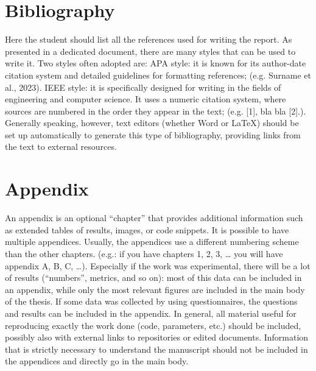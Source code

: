 \documentclass[a4paper, oneside]{book}
\begin{document}



\tableofcontents






\chapter{Bibliography}

Here the student should list all the references used for writing the report. As presented in a dedicated document, there are many styles that can be used to write it. Two styles often adopted are:
APA style: it is known for its author-date citation system and detailed guidelines for formatting references; (e.g. Surname et al., 2023).
IEEE style: it is specifically designed for writing in the fields of engineering and computer science. It uses a numeric citation system, where sources are numbered in the order they appear in the text; (e.g. [1], bla bla [2].).
Generally speaking, however, text editors (whether Word or LaTeX) should be set up automatically to generate this type of bibliography, providing links from the text to external resources.


\chapter{Appendix}

An appendix is an optional “chapter” that provides additional information such as extended tables of results, images, or code snippets. It is possible to have multiple appendices. Usually, the appendices use a different numbering scheme than the other chapters. (e.g.: if you have chapters 1, 2, 3, … you will have appendix A, B, C, …). Especially if the work was experimental, there will be a lot of results (“numbers”, metrics, and so on): most of this data can be included in an appendix, while only the most relevant figures are included in the main body of the thesis. If some data was collected by using questionnaires, the questions and results can be  included in the appendix. In general, all material useful for reproducing exactly the work done (code, parameters, etc.) should be included, possibly also with external links to repositories or edited documents. Information that is strictly necessary to understand the manuscript should not be included in the appendices and directly go in the main body.
\end{document}
